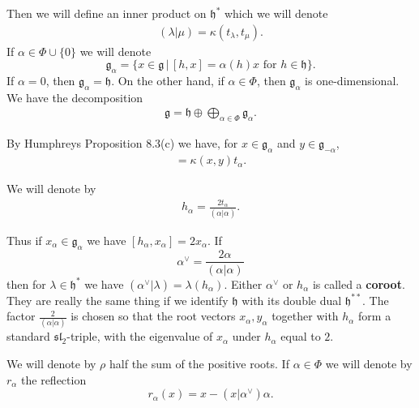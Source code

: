 \documentclass[12pt]{article}
\begin{document}
Then we will define an inner product on $\mathfrak{h}^*$ which we will denote
\begin{align*}
    (\lambda | \mu) = \kappa(t_\lambda, t_\mu).
\end{align*}
If $\alpha \in \Phi \cup \{0\}$ we will denote
\[
    \mathfrak{g}_\alpha = \{x \in \mathfrak{g} \,|\, [h,x] = \alpha(h)x \text{ for } h \in \mathfrak{h} \}.
\]
If $\alpha = 0$, then $\mathfrak{g}_\alpha = \mathfrak{h}$. On the other hand, if $\alpha \in \Phi$, then $\mathfrak{g}_\alpha$ is one-dimensional. We have the decomposition
\begin{align*}
    \mathfrak{g} = \mathfrak{h} \oplus \bigoplus_{\alpha \in \Phi} \mathfrak{g}_\alpha.
\end{align*}

By Humphreys Proposition 8.3(c) we have, for $x \in \mathfrak{g}_\alpha$ and $y \in \mathfrak{g}_{-\alpha}$,
\begin{align*}
    [x,y] = \kappa(x,y)t_\alpha.
\end{align*}

We will denote by
\begin{align*}
    h_\alpha = \frac{2t_\alpha}{(\alpha|\alpha)}.
\end{align*}

Thus if $x_\alpha \in \mathfrak{g}_\alpha$ we have $[h_\alpha, x_\alpha] = 2x_\alpha$. If
\[
    \alpha^\vee = \frac{2\alpha}{(\alpha|\alpha)}
\]
then for $\lambda \in \mathfrak{h}^*$ we have $(\alpha^\vee | \lambda) = \lambda(h_\alpha)$. Either $\alpha^\vee$ or $h_\alpha$ is called a \textbf{coroot}. They are really the same thing if we identify $\mathfrak{h}$ with its double dual $\mathfrak{h}^{**}$. The factor $\tfrac{2}{(\alpha|\alpha)}$ is chosen so that the root vectors $x_\alpha, y_\alpha$ together with $h_\alpha$ form a standard $\mathfrak{sl}_2$-triple, with the eigenvalue of $x_\alpha$ under $h_\alpha$ equal to $2$.

We will denote by $\rho$ half the sum of the positive roots. If $\alpha \in \Phi$ we will denote by $r_\alpha$ the reflection
\[
    r_\alpha(x) = x - (x|\alpha^\vee)\alpha.
\]
\end{document}
